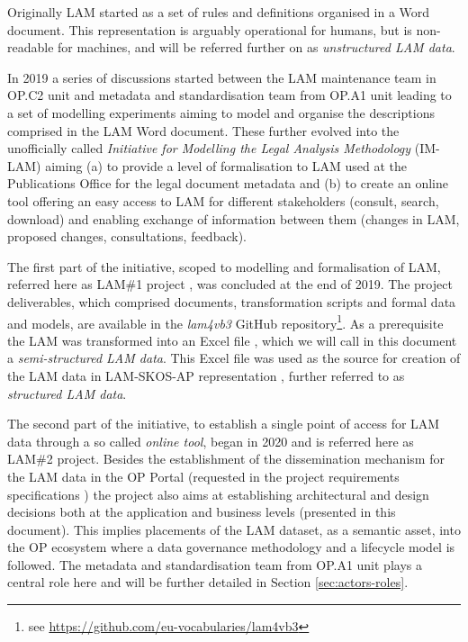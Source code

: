 	Originally LAM started as a set of rules and definitions organised in a Word document. This representation is arguably operational for humans, but is non-readable for machines, and will be referred further on as \textit{unstructured LAM data}. 
	
	In 2019 a series of discussions started between the LAM maintenance team in OP.C2 unit and metadata and standardisation team from OP.A1 unit leading to a set of modelling experiments aiming to model and organise the descriptions comprised in the LAM Word document\citep{lam-eurlex-spec-2017}. These further evolved into the unofficially called \textit{Initiative for Modelling the Legal Analysis Methodology} (IM-LAM) \citep{lam-preliminary-requirements-2019} aiming (a) to provide a level of formalisation to LAM used at the Publications Office for the legal document metadata and (b) to create an online tool offering an easy access to LAM for different stakeholders (consult, search, download) and enabling exchange of information between them (changes in LAM, proposed changes, consultations, feedback).
	
	The first part of the initiative, scoped to modelling and formalisation of LAM, referred here as LAM\#1 project \citep{lam-preliminary-requirements-2019}, was concluded at the end of 2019. The project deliverables, which comprised documents, transformation scripts and formal data and models, are available in the \textit{lam4vb3} GitHub repository\footnote{see \url{https://github.com/eu-vocabularies/lam4vb3}}. As a prerequisite the LAM was transformed into an Excel file \citep{lam-excel-structure-2019}, which we will call in this document a \textit{semi-structured LAM data}. This Excel file was used as the source for creation of the LAM data in LAM-SKOS-AP representation \citep{lam-skos-ap-2019}, further referred to as \textit{structured LAM data}.

	The second part of the initiative, to establish a single point of access for LAM data through a so called \textit{online tool}, began in 2020 and is referred here as LAM\#2 project. Besides the establishment of the dissemination mechanism for the LAM data in the OP Portal (requested in the project requirements specifications \citep{lam-requirements-2020}) the project also aims at establishing architectural and design decisions both at the application and business levels (presented in this document). This implies placements of the LAM dataset, as a semantic asset, into the OP ecosystem where a data governance methodology and a lifecycle model is followed. The metadata and standardisation team from OP.A1 unit plays a central role here and will be further detailed in Section \ref{sec:actors-roles}.
	

